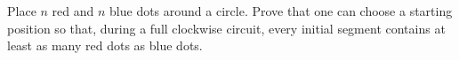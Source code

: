 Place $n$ red and $n$ blue dots around a circle. Prove that one can choose a starting position so that, during a full clockwise circuit, every initial segment contains at least as many red dots as blue dots.

